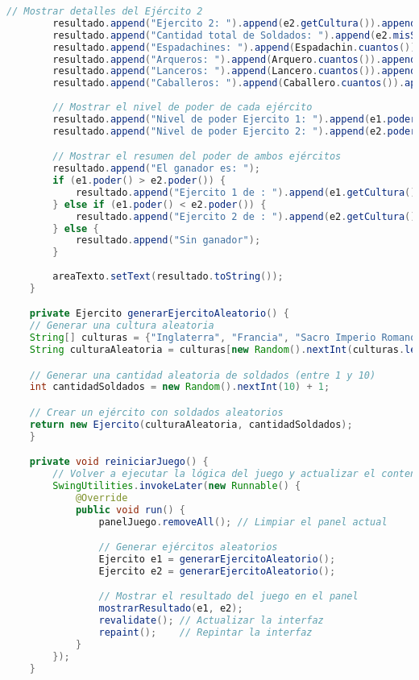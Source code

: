 \documentclass{article}
\begin{document}
\begin{itemize}
\begin{lstlisting}[language=java]
        // Mostrar detalles del Ejército 2
        resultado.append("Ejercito 2: ").append(e2.getCultura()).append("\n");
        resultado.append("Cantidad total de Soldados: ").append(e2.misSoldados.size()).append("\n");
        resultado.append("Espadachines: ").append(Espadachin.cuantos()).append("\n");
        resultado.append("Arqueros: ").append(Arquero.cuantos()).append("\n");
        resultado.append("Lanceros: ").append(Lancero.cuantos()).append("\n");
        resultado.append("Caballeros: ").append(Caballero.cuantos()).append("\n\n");
    
        // Mostrar el nivel de poder de cada ejército
        resultado.append("Nivel de poder Ejercito 1: ").append(e1.poder()).append("\n");
        resultado.append("Nivel de poder Ejercito 2: ").append(e2.poder()).append("\n\n");

        // Mostrar el resumen del poder de ambos ejércitos
        resultado.append("El ganador es: ");
        if (e1.poder() > e2.poder()) {
            resultado.append("Ejercito 1 de : ").append(e1.getCultura());
        } else if (e1.poder() < e2.poder()) {
            resultado.append("Ejercito 2 de : ").append(e2.getCultura());
        } else {
            resultado.append("Sin ganador");
        }
    
        areaTexto.setText(resultado.toString());
    }

    private Ejercito generarEjercitoAleatorio() {
    // Generar una cultura aleatoria
    String[] culturas = {"Inglaterra", "Francia", "Sacro Imperio Romano Germanico", "Aragon", "Moros"};
    String culturaAleatoria = culturas[new Random().nextInt(culturas.length)];

    // Generar una cantidad aleatoria de soldados (entre 1 y 10)
    int cantidadSoldados = new Random().nextInt(10) + 1;

    // Crear un ejército con soldados aleatorios
    return new Ejercito(culturaAleatoria, cantidadSoldados);
    }

    private void reiniciarJuego() {
        // Volver a ejecutar la lógica del juego y actualizar el contenido en el panel
        SwingUtilities.invokeLater(new Runnable() {
            @Override
            public void run() {
                panelJuego.removeAll(); // Limpiar el panel actual

                // Generar ejércitos aleatorios
                Ejercito e1 = generarEjercitoAleatorio();
                Ejercito e2 = generarEjercitoAleatorio();

                // Mostrar el resultado del juego en el panel
                mostrarResultado(e1, e2);
                revalidate(); // Actualizar la interfaz
                repaint();    // Repintar la interfaz
            }
        });
    }


\end{lstlisting}
\end{itemize}
\end{document}
